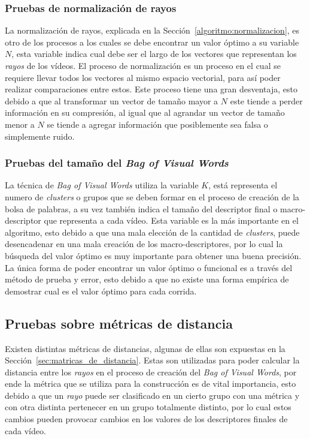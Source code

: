 	\subsubsection{Pruebas de normalización de rayos}	
	
	La normalización de rayos, explicada en la Sección~\ref{algoritmo:normalizacion}, es otro de los procesos a los cuales se debe encontrar un valor óptimo a su variable $N$, esta variable indica cual debe ser el largo de los vectores que representan los \textit{rayos} de los vídeos. El proceso de normalización es un proceso en el cual se requiere llevar todos los vectores al mismo espacio vectorial, para así poder realizar comparaciones entre estos. Este proceso tiene una gran desventaja, esto debido a que al transformar un vector de tamaño mayor a $N$ este tiende a perder información en su compresión, al igual que al agrandar un vector de tamaño menor a $N$ se tiende a agregar información que posiblemente sea falsa o simplemente ruido.

	\subsubsection{Pruebas del tamaño del \textit{Bag of Visual Words}}
	La técnica de \textit{Bag of Visual Words} utiliza la variable $K$, está representa el numero de \textit{clusters} o grupos que se deben formar en el proceso de creación de la bolsa de palabras, a su vez también indica el tamaño del descriptor final o macro-descriptor que representa a cada vídeo. Esta variable es la  más importante en el algoritmo, esto debido a que una mala elección de la cantidad de \textit{clusters}, puede desencadenar en una mala creación de los macro-descriptores, por lo cual la búsqueda del valor óptimo es muy importante para obtener una buena precisión. La única forma de poder encontrar un valor óptimo o funcional es a través del método de prueba y error, esto debido a que no existe una forma empírica de demostrar cual es el valor óptimo para cada corrida.


\subsection{Pruebas sobre métricas de distancia}
\label{exp:metricas}
Existen distintas métricas de distancias, algunas de ellas son expuestas en la Sección~\ref{sec:matricas_de_distancia}. Estas son utilizadas para poder calcular la distancia entre los \textit{rayos} en el proceso de creación del \textit{Bag of Visual Words}, por ende la métrica que se utiliza para la construcción es de vital importancia, esto debido a que un \textit{rayo} puede ser clasificado en un cierto grupo con una métrica y con otra distinta pertenecer en un grupo totalmente distinto, por lo cual estos cambios pueden provocar cambios en los valores de los descriptores finales de cada vídeo.
